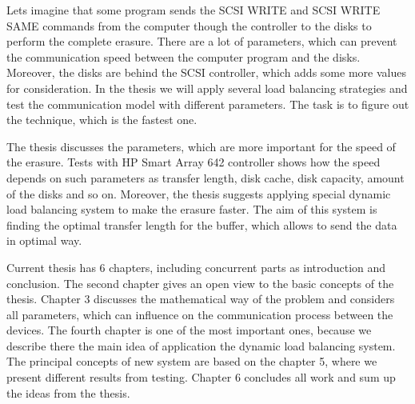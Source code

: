 Lets imagine that some program sends the SCSI WRITE and SCSI WRITE SAME commands from the computer though the controller to the disks to perform the complete erasure. There are a lot of parameters, which can prevent the communication speed between the computer program and the disks. Moreover, the disks are behind the SCSI controller, which adds some more values for consideration. In the thesis we will apply several load balancing strategies and test the communication model with different parameters. The task is to figure out the technique, which is the fastest one.

The thesis discusses the parameters, which are more important for the speed of the erasure. Tests with HP Smart Array 642 controller shows how the speed depends on such parameters as transfer length, disk cache, disk capacity, amount of the disks and so on. Moreover, the thesis suggests applying special dynamic load balancing system to make the erasure faster. The aim of this system is finding the optimal transfer length for the buffer, which allows to send the data in optimal way. 

Current thesis has 6 chapters, including concurrent parts as introduction and conclusion. The second chapter gives an open view to the basic concepts of the thesis. Chapter 3 discusses the mathematical way of the problem and considers all parameters, which can influence on the communication process between the devices. The fourth chapter is one of the most important ones, because we describe there the main idea of application the dynamic load balancing system. The principal concepts of new system are based on the chapter 5, where we present different results from testing. Chapter 6 concludes all work and sum up the ideas from the thesis.

